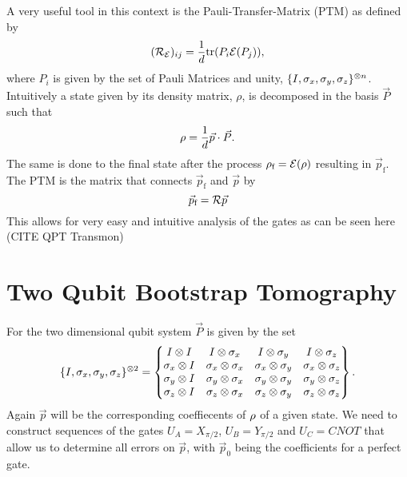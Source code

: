 A very useful tool in this context is the Pauli-Transfer-Matrix (PTM) as defined by
\begin{equation}
    (\mathcal{R}_{\mathcal{E}})_{ij}=\frac{1}{d}\mathrm{tr}{(P_i \mathcal{E}(P_j))},
\end{equation}
where $P_i$ is given by the set of Pauli Matrices and unity, $\{I, \sigma_x,\sigma_y,\sigma_z\}^{\otimes n}$.
Intuitively a state given by its density matrix, $\rho$, is decomposed in the basis $\vec{P}$ such that
\begin{equation}
\rho = \frac{1}{d} \vec{p} \cdot \vec{P}.
\end{equation}
The same is done to the final state after the process $\rho_\text{f}=\mathcal{E}(\rho)$ resulting in $\vec{p}_\text{f}$. The PTM is the matrix that connects $\vec{p}_\text{f}$ and $\vec{p}$ by \begin{equation}
    \vec{p}_\text{f}=\mathcal{R} \vec{p}
\end{equation}
This allows for very easy and intuitive analysis of the gates as can be seen here (CITE QPT Transmon)

\section{Two Qubit Bootstrap Tomography}
For the two dimensional qubit system $\vec{P}$ is given by the set
\begin{equation}
\{I, \sigma_x,\sigma_y,\sigma_z\}^{\otimes 2}=
\begin{Bmatrix}
I \otimes I & I \otimes \sigma_x & I \otimes \sigma_y & I \otimes \sigma_z \\
\sigma_x \otimes I & \sigma_x \otimes \sigma_x & \sigma_x \otimes \sigma_y & \sigma_x \otimes\sigma_z \\
\sigma_y \otimes I & \sigma_y \otimes \sigma_x & \sigma_y \otimes \sigma_y & \sigma_y \otimes \sigma_z \\
\sigma_z \otimes I & \sigma_z \otimes \sigma_x & \sigma_z \otimes \sigma_y & \sigma_z \otimes \sigma_z 
\end{Bmatrix}.
\end{equation}
Again $\vec{p}$ will be the corresponding coeffiecents of $\rho$ of a given state. We need to construct sequences of the gates
$U_A = X_{\pi/2}$, $U_B = Y_{\pi/2}$ and $U_C = CNOT$ that allow us to determine all errors on $\vec{p}$, with $\vec{p}_0$ being the coefficients for a perfect gate. 

